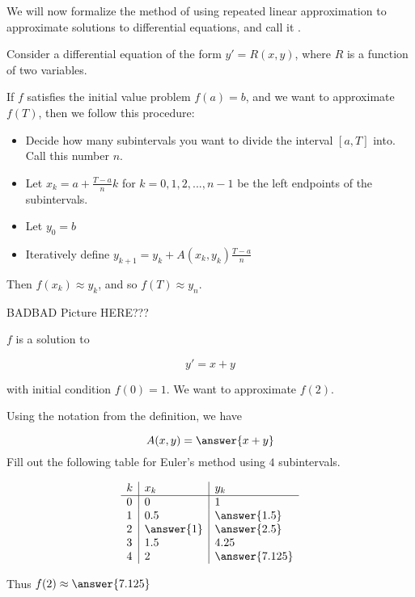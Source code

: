 \documentclass{ximera}
\begin{document}
We will now formalize the method of using repeated linear approximation to approximate solutions to differential equations, and call it .

\begin{definition}
Consider a differential equation of the form $y' = R(x,y)$, where $R$ is a function of two variables.

If $f$ satisfies the initial value problem $f(a) = b$, and we want to approximate $f(T)$, then we follow this procedure:

\begin{itemize}
	\item Decide how many subintervals you want to divide the interval $[a,T]$ into.  Call this number $n$.
	\item Let $x_k = a+\frac{T-a}{n}k$ for $k=0,1,2,...,n-1$ be the left endpoints of the subintervals.
	\item Let $y_0 = b$
	\item Iteratively define $y_{k+1} = y_k+A(x_k,y_k)\frac{T-a}{n}$ 
\end{itemize}

Then $f(x_k) \approx y_k$, and so $f(T) \approx y_{n}$.

\end{definition}

BADBAD Picture HERE???



\begin{question}
$f$ is a solution to 

\[
y'=x+y
\]

with initial condition $f(0)=1$.  We want to approximate $f(2)$.  

Using the notation from the definition, we have 

\[
A(x,y) = \answer{x+y}
\]
Fill out the following table for Euler's method using $4$ subintervals.

	\[
\begin{array}{l|l|l}
k & x_k & y_k \\ \hline
0 & 0   & 1 \\
1 & 0.5 & \answer{1.5} \\
2 & \answer{1} & \answer{2.5}  \\
3 & 1.5 & 4.25 \\
4 & 2 & \answer{7.125} \\
\end{array}
\]

	Thus $f(2) \approx \answer{7.125}$

\end{question}	
\end{document}
